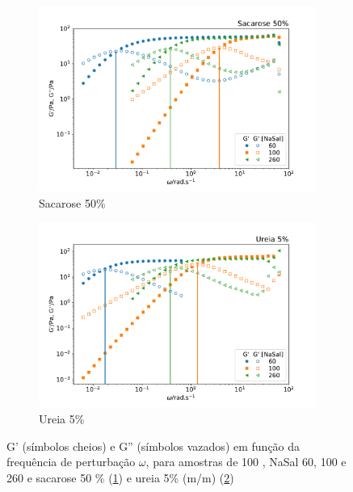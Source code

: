 	\begin{figure}[h]
		\begin{subfigure}[t]{0.5\textwidth}
			\centering
			\includegraphics[width=\textwidth]{imagens/reologia/oscilatorio_sac50p}
			\caption{Sacarose 50\%}
			\label{fig:oscilatorio_sac_50p}
		\end{subfigure} %
		\begin{subfigure}[t]{0.5\textwidth}
			\centering
			\includegraphics[width=\textwidth]{imagens/reologia/oscilatorio_ur5p}
			\caption{Ureia 5\%}
			\label{fig:oscilatorio_ur_5p}
		\end{subfigure} 
	\caption{G' (símbolos cheios) e G'' (símbolos vazados) em função da frequência de perturbação \(\omega\), para amostras de \CTAB{} 100 \mM{}, NaSal 60, 100 e 260 \mM{} e sacarose 50 \% (\ref{fig:oscilatorio_sac_50p}) e ureia 5\% (m/m) (\ref{fig:oscilatorio_ur_5p})}
	\label{fig:oscilatorio_ur_sacarose}
	\end{figure} 	 	

